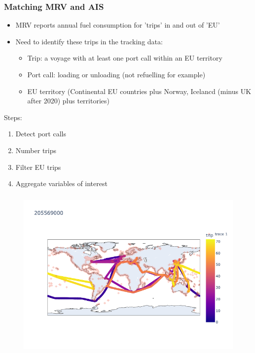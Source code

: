 \documentclass{beamer}
\begin{document}
\begin{frame}
\frametitle{Matching MRV and AIS}

\begin{itemize}
    \item MRV reports annual fuel consumption for 'trips' in and out of 'EU'
    \item Need to identify these trips in the tracking data:
    \begin{itemize}
        \item Trip: a voyage with at least one port call within an EU territory
        \item Port call: loading or unloading (not refuelling for example)
        \item EU territory (Continental EU countries plus Norway, Icelancd (minus UK after 2020) plus territories)
    \end{itemize}
\end{itemize}

\vfill

Steps:
\begin{enumerate}
    \item Detect port calls
    \item Number trips
    \item Filter EU trips
    \item Aggregate variables of interest
\end{enumerate}

\end{frame}


\begin{frame}
\frametitle{}
\begin{figure}
    \includegraphics[width = \textwidth]{205569000_trips.png}
\end{figure}
\end{frame}

\end{document}
